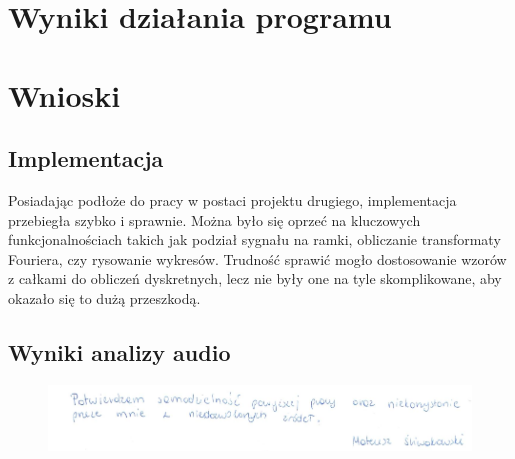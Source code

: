 \documentclass{article}
\begin{document}
\section{Wyniki działania programu}

\section{Wnioski}
\subsection{Implementacja}
Posiadając podłoże do pracy w postaci projektu drugiego, implementacja przebiegła szybko i sprawnie. Można było się oprzeć na kluczowych funkcjonalnościach takich jak podział sygnału na ramki, obliczanie transformaty Fouriera, czy rysowanie wykresów. Trudność sprawić mogło dostosowanie wzorów z całkami do obliczeń dyskretnych, lecz nie były one na tyle skomplikowane, aby okazało się to dużą przeszkodą.

\subsection{Wyniki analizy audio}


\begin{figure}[b]
\centering
\includegraphics[width=5in]{bottom.png}
\end{figure}
\end{document}
